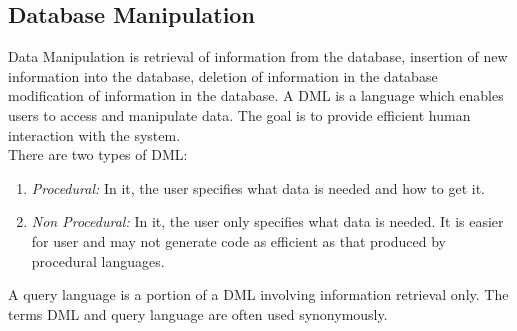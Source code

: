 \subsection{Database Manipulation}
Data Manipulation is retrieval of information from the database, insertion of new information into the database, deletion of information in the database modification of information in the database. A DML is a language which enables users to access and manipulate data.
The goal is to provide efficient human interaction with the system.\\

There are two types of DML:
\begin{enumerate}
\item \emph{Procedural:} In it, the user specifies what data is needed and how to get it.
\item \emph{Non Procedural:} In it, the user only specifies what data is needed. It is easier for user and may not generate code as efficient as that produced by procedural languages.
\end{enumerate}
 A query language is a portion of a DML involving information retrieval only. The terms DML and query language are often used synonymously. 
